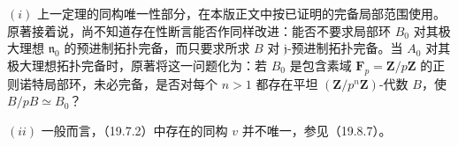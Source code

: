 $(i)$ 上一定理的同构唯一性部分，在本版正文中按已证明的完备局部范围使用。
原著接着说，尚不知道存在性断言能否作同样改进：能否不要求局部环 $B_0$ 对其极大理想 $\mathfrak n_0$ 的预进制拓扑完备，而只要求所求 $B$ 对 $\mathfrak j$-预进制拓扑完备。当 $A_0$ 对其极大理想拓扑完备时，原著将这一问题化为：若 $B_0$ 是包含素域 $\mathbf F_p=\mathbf Z/p\mathbf Z$ 的正则诺特局部环，未必完备，是否对每个 $n>1$ 都存在平坦 $(\mathbf Z/p^n\mathbf Z)$-代数 $B$，使 $B/pB\simeq B_0$？

$(ii)$ 一般而言，（19.7.2）中存在的同构 $v$ 并不唯一，参见（19.8.7）。

